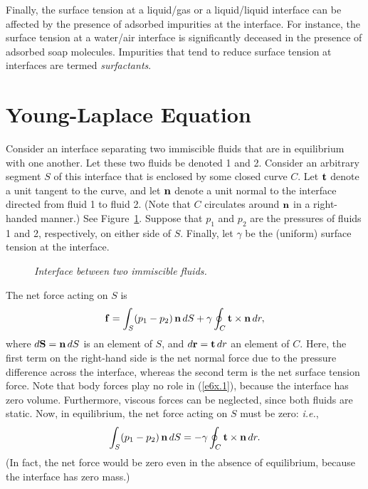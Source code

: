 Finally, the 
surface tension at a liquid/gas or a liquid/liquid interface can be 
affected by the presence of  adsorbed impurities at the interface. For instance, the surface tension at a water/air interface
is significantly deceased in the presence of adsorbed soap molecules. Impurities
that tend to reduce surface tension at interfaces are termed {\em surfactants}. 

\section{Young-Laplace Equation}
Consider an interface separating two immiscible fluids that are in equilibrium with one another. Let these two
fluids be denoted 1 and 2. Consider an arbitrary segment $S$ of this interface that is enclosed by some closed curve $C$. 
Let ${\bf t}$ denote a unit tangent to the curve, and let ${\bf n}$ denote a unit normal to the
interface directed from fluid 1 to fluid 2. (Note that $C$ circulates around ${\bf n}$ in a
right-handed manner.) See Figure~\ref{f6x.01}. Suppose that $p_1$ and $p_2$ are the 
pressures of fluids 1 and 2, respectively, on either side of $S$. Finally, let $\gamma$ be the (uniform) 
surface tension at the interface. 
 
\begin{figure}
\epsfysize=1.5in
\centerline{}
\caption{\em Interface between two immiscible fluids.}\label{f6x.01}
\end{figure}

The net force acting on $S$ is
\begin{equation}\label{e6x.1}
{\bf f} =\int_S  (p_1-p_2)\,{\bf n}\,dS + \gamma \oint_C {\bf t}\times {\bf n}\,dr,
\end{equation}
where $d{\bf S} = {\bf n}\,dS$ is an element of $S$, and $d{\bf r}= {\bf t}\,dr$ an element of $C$. Here, the first term on the
right-hand side is the net normal force due to the pressure difference across the interface, whereas the
second term is the net surface tension force. 
Note that body forces play no role in (\ref{e6x.1}), because the interface has zero volume. Furthermore, 
viscous forces can be neglected, since both fluids are static.
Now, in equilibrium,
the net  force acting on $S$ must be zero: {\em i.e.}, 
\begin{equation}\label{e6x.2}
\int_S (p_1-p_2)\,{\bf n}\,dS =- \gamma \oint_C {\bf t}\times {\bf n}\,dr.
\end{equation}
(In fact, the net force would be zero even in the absence of equilibrium, because the interface has zero mass.)

